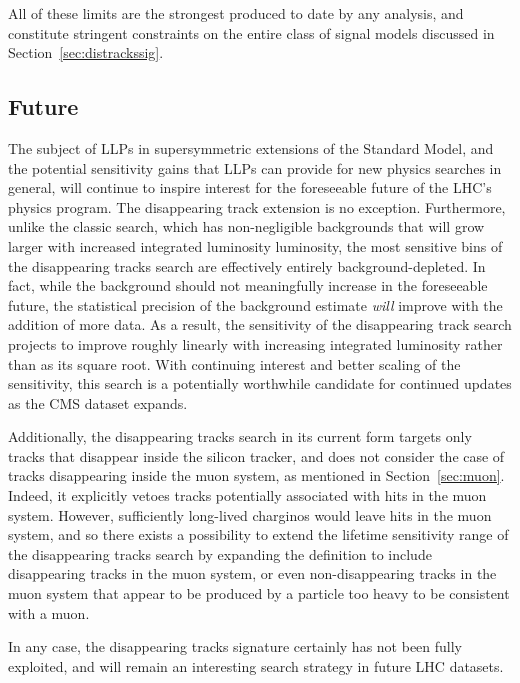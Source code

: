   All of these limits are the strongest produced to date by any analysis, and constitute stringent constraints on the entire class of signal models discussed in Section~\ref{sec:distrackssig}.

  \subsection{Future} \label{sec:distracksfuture}
  
  The subject of LLPs in supersymmetric extensions of the Standard Model, and the potential sensitivity gains that LLPs can provide for new physics searches in general, will continue to inspire interest for the foreseeable future of the LHC's physics program.
  The \mttwo disappearing track extension is no exception.
  Furthermore, unlike the classic search, which has non-negligible backgrounds that will grow larger with increased integrated luminosity luminosity, the most sensitive bins of the disappearing tracks search are effectively entirely background-depleted.
  In fact, while the background should not meaningfully increase in the foreseeable future, the statistical precision of the background estimate {\it will} improve with the addition of more data.
  As a result, the sensitivity of the disappearing track search projects to improve roughly linearly with increasing integrated luminosity rather than as its square root.
  With continuing interest and better scaling of the sensitivity, this search is a potentially worthwhile candidate for continued updates as the CMS dataset expands.

  Additionally, the disappearing tracks search in its current form targets only tracks that disappear inside the silicon tracker, and does not consider the case of tracks disappearing inside the muon system, as mentioned in Section~\ref{sec:muon}.
  Indeed, it explicitly vetoes tracks potentially associated with hits in the muon system.
  However, sufficiently long-lived charginos would leave hits in the muon system, and so there exists a possibility to extend the lifetime sensitivity range of the disappearing tracks search by expanding the definition to include disappearing tracks in the muon system, or even non-disappearing tracks in the muon system that appear to be produced by a particle too heavy to be consistent with a muon.

  In any case, the disappearing tracks signature certainly has not been fully exploited, and will remain an interesting search strategy in future LHC datasets.


